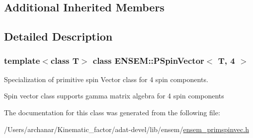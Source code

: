 \subsection*{Additional Inherited Members}


\subsection{Detailed Description}
\subsubsection*{template$<$class T$>$\newline
class E\+N\+S\+E\+M\+::\+P\+Spin\+Vector$<$ T, 4 $>$}

Specialization of primitive spin Vector class for 4 spin components. 

Spin vector class supports gamma matrix algebra for 4 spin components 

The documentation for this class was generated from the following file\+:\begin{DoxyCompactItemize}
\item 
/\+Users/archanar/\+Kinematic\+\_\+factor/adat-\/devel/lib/ensem/\mbox{\hyperlink{adat-devel_2lib_2ensem_2ensem__primspinvec_8h}{ensem\+\_\+primspinvec.\+h}}\end{DoxyCompactItemize}
